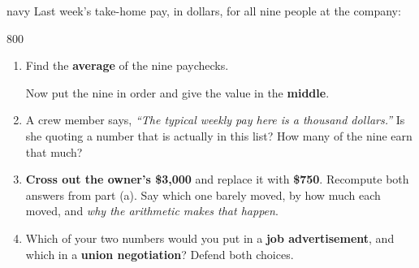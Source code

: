 \documentclass[12pt]{article}
\newcommand{\answerspace}[2]{\par\nopagebreak\noindent\begin{minipage}[t][#1][t]{\linewidth}%
  \color{keyred}\bfseries #2\end{minipage}\par}
\begin{document}
\begin{scenariobox}{navy}
Last week's take-home pay, in dollars, for all nine people at the company:

\vspace{3pt}
\begin{center}
800        
\end{center}
\vspace{2pt}

\begin{center}
\end{center}
\vspace{1pt}

\normalsize
\begin{enumerate}[label=\textbf{\alph*.}, leftmargin=1.8em, itemsep=4pt]
  \item Find the \textbf{average} of the nine paychecks. \blank{2.6cm}

        Now put the nine in order and give the value in the \textbf{middle}. \blank{2.6cm}
  \item A crew member says, \emph{``The typical weekly pay here is a thousand dollars.''} Is she
        quoting a number that is actually in this list? How many of the nine earn that much?
        \answerspace{1.4cm}{}
  \item \textbf{Cross out the owner's \$3{,}000} and replace it with \textbf{\$750}. Recompute
        both answers from part (a). Say which one barely moved, by how much each moved, and
        \emph{why the arithmetic makes that happen}.
        \answerspace{2.0cm}{}
  \item Which of your two numbers would you put in a \textbf{job advertisement}, and which in a
        \textbf{union negotiation}? Defend both choices.
        \answerspace{1.6cm}{}
\end{enumerate}
\end{scenariobox}
\end{document}
